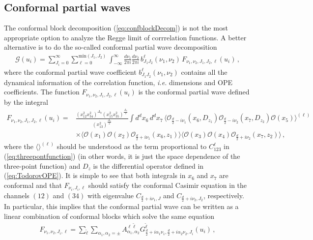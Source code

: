 \subsection{Conformal partial waves}
The conformal block decomposition (\ref{eq:confblockDecom}) is not the most appropriate option to analyze the Regge limit of corrrelation functions.
A better alternative is to do the so-called conformal partial wave decomposition
\begin{align}
  \mathcal{G}(u_i) = \sum_{J_i=0}^{\infty}\sum_{\ell=0}^{\textrm{min}(J_1,J_2)}\int_{-\infty}^{\infty}\frac{d\nu_1}{2 \pi i }\frac{d\nu_2}{2 \pi i } \,b_{J_1J_2}^{\ell}(\nu_1,\nu_2)\, F_{\nu_1,\nu_2,J_1,J_2,\ell}(u_i)\,,
\end{align}
where the conformal partial wave coefficient  $b_{J_1J_2}^{\ell}(\nu_1,\nu_2)$ contains all the dynamical information of the correlation function, {\em {i.e.}} dimensions and OPE coefficients. The function $F_{\nu_1,\nu_2,J_1,J_2,\ell}(u_i)$ is the conformal partial wave defined by the integral
\begin{align}
  \label{eq:confPartialWaveFivePoints}
  F_{\nu_1,\nu_2,J_1,J_2,\ell}(u_i) = & \tfrac{(x_{12}^2x_{34}^2)^{\Delta_{\phi}}(x_{15}^2x_{35}^2)^{\frac{\Delta_{\phi}}{2}} }{(x_{13}^2)^{\frac{\Delta_{\phi}}{2}}} \int d^dx_6 \, d^dx_7\, \langle \mathcal{O}_{\frac{d}{2}-i\nu_1}(x_6,D_{z_1})\mathcal{O}_{\frac{d}{2}-i\nu_2}(x_7,D_{z_2})  \mathcal{O}(x_5) \rangle^{(\ell)}  \nonumber \\
                                        & \times \langle \mathcal{O}(x_1)\mathcal{O}(x_2) \mathcal{O}_{\frac{d}{2}+i\nu_1}(x_6,z_1) \rangle \langle \mathcal{O}(x_3)\mathcal{O}(x_4) \mathcal{O}_{\frac{d}{2} +i\nu_2}(x_7,z_2) \rangle\,,
\end{align}
where the $\langle \rangle^{(\ell)}$ should be understood as the term proportional to  $C_{123}^{\ell}$ in (\ref{eq:threepontfunction}) (in other words, it is just the space dependence of the three-point function) and $D_{z}$ is the differential operator defined in (\ref{eq:TodorovOPE}).  It is simple to see that both integrals in $x_6$ and $x_7$ are conformal and that $F_{\nu_i,J_i,\ell}$ should satisfy the conformal Casimir equation in the channels $(12)$ and $(34)$ with eigenvalue $C_{\frac{d}{2}+i\nu_1,J}$ and $C_{\frac{d}{2}+i\nu_2,J_2}$, respectively. In particular, this implies that the conformal partial wave can be written as a linear combination of
conformal blocks which solve the same equation
\begin{align}
  \!\!F_{\nu_1,\nu_2,J_i,\ell}  = \sum_{\tilde{\ell}}\sum_{\alpha_1,\alpha_2 =\pm}
  A_{\alpha_1,\alpha_2}^{\ell\tilde{\ell}} G_{\frac{d}{2}+i \alpha_1 \nu_1,\frac{d}{2}+i\alpha_2 \nu_2,J_i }^{\tilde{\ell}} (u_i) \,,
  \label{eq:conformalpartialwave}
\end{align}
